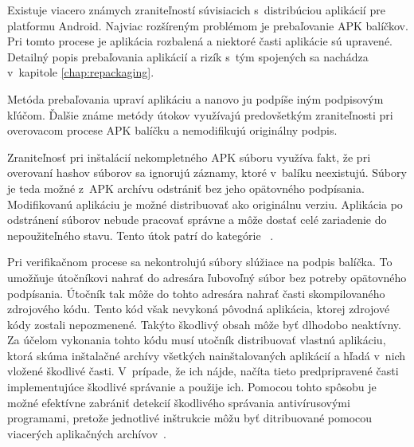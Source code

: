 Existuje viacero známych zraniteľností súvisiacich s~distribúciou aplikácií  pre platformu Android. Najviac rozšíreným problémom je prebaľovanie APK balíčkov. Pri tomto procese je aplikácia rozbalená a niektoré časti aplikácie sú upravené. Detailný popis prebaľovania aplikácií a rizík s~tým spojených sa nachádza v~kapitole \ref{chap:repackaging}.

Metóda prebaľovania upraví aplikáciu a nanovo ju podpíše iným podpisovým kľúčom. Ďalšie známe metódy útokov využívajú predovšetkým zraniteľnosti pri overovacom procese APK balíčku a nemodifikujú originálny podpis. 

Zraniteľnosť pri inštalácií nekompletného APK súboru využíva fakt, že pri overovaní hashov súborov sa ignorujú záznamy, ktoré v~balíku neexistujú. Súbory je teda možné z~APK archívu odstrániť bez jeho opätovného podpísania. Modifikovanú aplikáciu je možné distribuovať ako originálnu verziu. Aplikácia po odstránení súborov nebude pracovať správne a môže dostať celé zariadenie do nepoužiteľného stavu. Tento útok patrí do kategórie ~\cite{A7idcou1z6WqKvQZ}.

Pri verifikačnom procese sa nekontrolujú súbory slúžiace na podpis balíčka. To umožňuje útočníkovi nahrať do adresára  ľubovoľný súbor bez potreby opätovného podpísania. Útočník tak môže do tohto adresára nahrať časti skompilovaného zdrojového kódu. Tento kód však nevykoná pôvodná aplikácia, ktorej zdrojové kódy zostali nepozmenené. Takýto škodlivý obsah môže byť dlhodobo neaktívny. Za účelom vykonania tohto kódu musí utočník distribuovať vlastnú aplikáciu, ktorá skúma inštalačné archívy všetkých nainštalovaných aplikácií a hľadá v~nich vložené škodlivé časti. V~prípade, že ich nájde, načíta tieto predpripravené časti implementujúce škodlivé správanie a použije ich. Pomocou tohto spôsobu je možné efektívne zabrániť detekcií škodlivého správania antivírusovými programami, pretože jednotlivé inštrukcie môžu byť ditribuované pomocou viacerých aplikačných archívov~\cite{A7idcou1z6WqKvQZ}.
